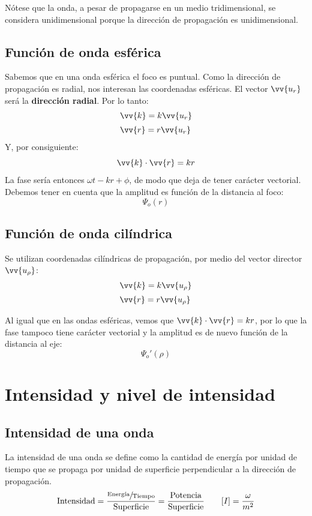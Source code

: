 \documentclass[a4paper]{book}
\numberwithin{figure}{chapter}
\numberwithin{equation}{chapter}
\renewcommand{\vec}[1]{\vv{{#1}}}
\begin{document}
Nótese que la onda, a pesar de propagarse en un medio tridimensional, se considera unidimensional porque la dirección de propagación es unidimensional.

\subsection{Función de onda esférica}
Sabemos que en una onda esférica el foco es puntual. Como la dirección de propagación es radial, nos interesan las coordenadas esféricas. El vector $\vec{u_r}$ será la \textbf{dirección radial}. Por lo tanto:
\[\begin{matrix*}[l]
		\vec{k} = k\vec{u_r}\\[5pt]
		\vec{r} = r\vec{u_r}
	\end{matrix*} \]
Y, por consiguiente:
\[\vec{k}\cdot \vec{r} = kr\]
La fase sería entonces $\omega t -kr +\phi$, de modo que deja de tener carácter vectorial. Debemos tener en cuenta que la amplitud es función de la distancia al foco:
\[\Psi_o(r)\]

\subsection{Función de onda cilíndrica}
Se utilizan coordenadas cilíndricas de propagación, por medio del vector director $\vec{u_\rho}$:
\[\begin{matrix*}[l]
		\vec{k} = k\vec{u_\rho}\\[5pt]
		\vec{r} = r\vec{u_\rho}
	\end{matrix*}\]

Al igual que en las ondas esféricas, vemos que $\vec{k}\cdot \vec{r} = kr$, por lo que la fase tampoco tiene carácter vectorial y la amplitud es de nuevo función de la distancia al eje:
\[\Psi_o'(\rho )\]

\section{Intensidad y nivel de intensidad}
\subsection{Intensidad de una onda}
La intensidad de una onda se define como la cantidad de energía por unidad de tiempo que se propaga por unidad de superficie perpendicular a la dirección de propagación.
\[\text{Intensidad} = \frac{\sfrac{\text{Energía}}{\text{Tiempo}}}{\text{Superficie}} = \frac{\text{Potencia}}{\text{Superficie}} \qquad [I ] = \frac{\omega}{m^2}\]
\end{document}
